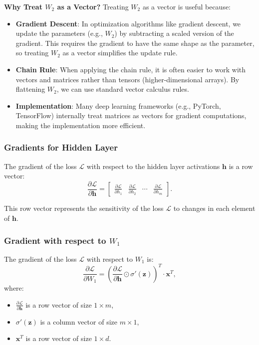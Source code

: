 \begin{notechapter}
\textbf{Why Treat \( W_2 \) as a Vector?}
Treating \( W_2 \) as a vector is useful because:
\begin{itemize}
    \item \textbf{Gradient Descent}: In optimization algorithms like gradient descent, we update the parameters (e.g., \( W_2 \)) by subtracting a scaled version of the gradient. This requires the gradient to have the same shape as the parameter, so treating \( W_2 \) as a vector simplifies the update rule.
    \item \textbf{Chain Rule}: When applying the chain rule, it is often easier to work with vectors and matrices rather than tensors (higher-dimensional arrays). By flattening \( W_2 \), we can use standard vector calculus rules.
    \item \textbf{Implementation}: Many deep learning frameworks (e.g., PyTorch, TensorFlow) internally treat matrices as vectors for gradient computations, making the implementation more efficient.
\end{itemize}

\subsubsection{Gradients for Hidden Layer}
The gradient of the loss \( \mathcal{L} \) with respect to the hidden layer activations \( \mathbf{h} \) is a row vector:
\[
\frac{\partial \mathcal{L}}{\partial \mathbf{h}} = \begin{bmatrix} 
\frac{\partial \mathcal{L}}{\partial h_1} & \frac{\partial \mathcal{L}}{\partial h_2} 
& \cdots & \frac{\partial \mathcal{L}}{\partial h_m} \end{bmatrix}.
\]

This row vector represents the sensitivity of the loss \( \mathcal{L} \) to changes in each element of \( \mathbf{h} \).

\subsubsection{Gradient with respect to \( W_1 \)}
The gradient of the loss \( \mathcal{L} \) with respect to \( W_1 \) is:
\[
\frac{\partial \mathcal{L}}{\partial W_1} = \left( \frac{\partial \mathcal{L}}{\partial \mathbf{h}} 
\odot \sigma'(\mathbf{z}) \right)^T \cdot \mathbf{x}^T,
\]
where:
\begin{itemize}
    \item \( \frac{\partial \mathcal{L}}{\partial \mathbf{h}} \) is a row vector of size \( 1 \times m \),
    \item \( \sigma'(\mathbf{z}) \) is a column vector of size \( m \times 1 \),
    \item \( \mathbf{x}^T \) is a row vector of size \( 1 \times d \).
\end{itemize}


\end{notechapter}
